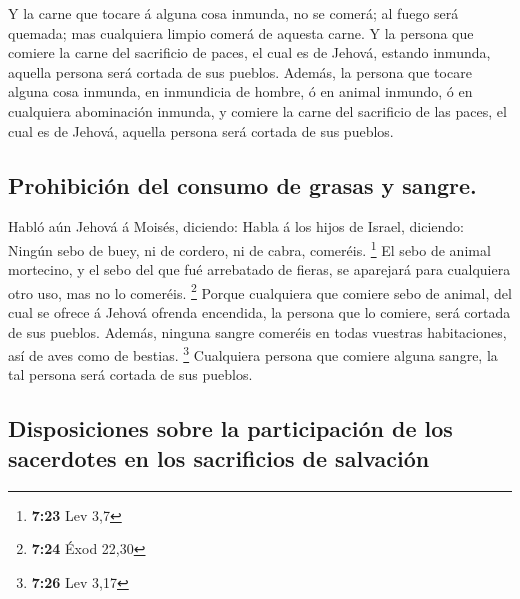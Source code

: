  Y la carne que tocare á alguna cosa inmunda, no se
comerá; al fuego será quemada; mas cualquiera limpio comerá de aquesta
carne.  Y la persona que comiere la carne del sacrificio
de paces, el cual es de Jehová, estando inmunda, aquella persona será
cortada de sus pueblos.  Además, la persona que tocare
alguna cosa inmunda, en inmundicia de hombre, ó en animal inmundo, ó en
cualquiera abominación inmunda, y comiere la carne del sacrificio de las
paces, el cual es de Jehová, aquella persona será cortada de sus
pueblos.

\hypertarget{prohibiciuxf3n-del-consumo-de-grasas-y-sangre.}{%
\subsection{Prohibición del consumo de grasas y
sangre.}\label{prohibiciuxf3n-del-consumo-de-grasas-y-sangre.}}

 Habló aún Jehová á Moisés, diciendo: 
Habla á los hijos de Israel, diciendo: Ningún sebo de buey, ni de
cordero, ni de cabra, comeréis. \footnote{\textbf{7:23} Lev 3,7}
 El sebo de animal mortecino, y el sebo del que fué
arrebatado de fieras, se aparejará para cualquiera otro uso, mas no lo
comeréis. \footnote{\textbf{7:24} Éxod 22,30}  Porque
cualquiera que comiere sebo de animal, del cual se ofrece á Jehová
ofrenda encendida, la persona que lo comiere, será cortada de sus
pueblos.  Además, ninguna sangre comeréis en todas
vuestras habitaciones, así de aves como de bestias. \footnote{\textbf{7:26}
  Lev 3,17}  Cualquiera persona que comiere alguna
sangre, la tal persona será cortada de sus pueblos.

\hypertarget{disposiciones-sobre-la-participaciuxf3n-de-los-sacerdotes-en-los-sacrificios-de-salvaciuxf3n}{%
\subsection{Disposiciones sobre la participación de los sacerdotes en
los sacrificios de
salvación}\label{disposiciones-sobre-la-participaciuxf3n-de-los-sacerdotes-en-los-sacrificios-de-salvaciuxf3n}}


